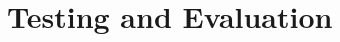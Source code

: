 \documentclass[../../main.tex]{subfiles}
\begin{document}
\chapter{Testing and Evaluation} \label{chapter:testing-and-evaluation}
\end{document}

